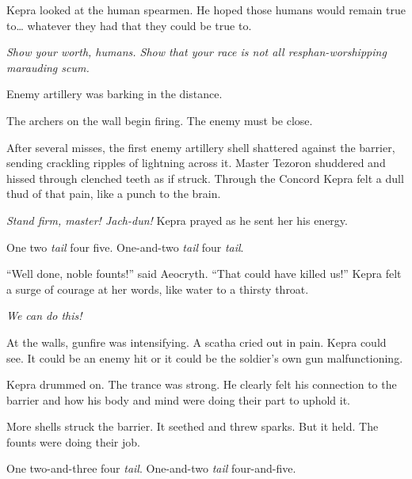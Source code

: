 \documentclass
  [a4paper,
   12pt,
   oneside
  ]%
  {article}
\newcommand{\sectionbreak}{\bigskip\noindent}
\begin{document}

Kepra looked at the human spearmen. He hoped those humans would remain true to… whatever they had that they could be true to. 

\emph{Show your worth, humans. Show that your race is not all resphan-worshipping marauding scum.}

\sectionbreak
Enemy artillery was barking in the distance.

The archers on the wall begin firing. The enemy must be close.

After several misses, the first enemy artillery shell shattered against the barrier, sending crackling ripples of lightning across it. Master Tezoron shuddered and hissed through clenched teeth as if struck. Through the Concord Kepra felt a dull thud of that pain, like a punch to the brain. 

\emph{Stand firm, master! Jach-dun!} Kepra prayed as he sent her his energy.

One two \emph{tail} four five. One-and-two \emph{tail} four \emph{tail}.

``Well done, noble founts!'' said Aeocryth. ``That could have killed us!'' 
Kepra felt a surge of courage at her words, like water to a thirsty throat. 

\emph{We can do this!}

At the walls, gunfire was intensifying. A scatha cried out in pain. Kepra could see. It could be an enemy hit or it could be the soldier’s own gun malfunctioning.

Kepra drummed on. The trance was strong. He clearly felt his connection to the barrier and how his body and mind were doing their part to uphold it.

More shells struck the barrier. It seethed and threw sparks. But it held. The founts were doing their job.

\sectionbreak
One two-and-three four \emph{tail}. One-and-two \emph{tail} four-and-five.
\end{document}
